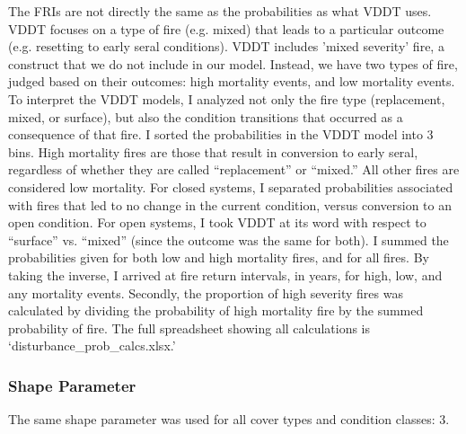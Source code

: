 The FRIs are not directly the same as the probabilities as what VDDT uses. VDDT focuses on a type of fire (e.g. mixed) that leads to a particular outcome (e.g. resetting to early seral conditions). VDDT includes 'mixed severity' fire, a construct that we do not include in our model. Instead, we have two types of fire, judged based on their outcomes: high mortality events, and low mortality events. To interpret the VDDT models, I analyzed not only the fire type (replacement, mixed, or surface), but also the condition transitions that occurred as a consequence of that fire. I sorted the probabilities in the VDDT model into 3 bins. High mortality fires are those that result in conversion to early seral, regardless of whether they are called ``replacement'' or ``mixed.'' All other fires are considered low mortality. For closed systems, I separated probabilities associated with fires that led to no change in the current condition, versus conversion to an open condition. For open systems, I took VDDT at its word with respect to ``surface'' vs. ``mixed'' (since the outcome was the same for both). I summed the probabilities given for both low and high mortality fires, and for all fires. By taking the inverse, I arrived at fire return intervals, in years, for high, low, and any mortality events. Secondly, the proportion of high severity fires was calculated by dividing the probability of high mortality fire by the summed probability of fire. The full spreadsheet showing all calculations is `disturbance_prob_calcs.xlsx.'

\subsubsection{Shape Parameter}
The same shape parameter was used for all cover types and condition classes: 3.

